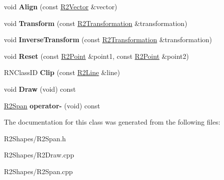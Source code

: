 \begin{DoxyCompactItemize}
\item 
void {\bfseries Align} (const \hyperlink{class_r2_vector}{R2\+Vector} \&vector)\hypertarget{class_r2_span_a7f236a19c3115d31fcbbd44357ebec0a}{}\label{class_r2_span_a7f236a19c3115d31fcbbd44357ebec0a}

\item 
void {\bfseries Transform} (const \hyperlink{class_r2_transformation}{R2\+Transformation} \&transformation)\hypertarget{class_r2_span_a11439f85eeacccb75f43660346f0b758}{}\label{class_r2_span_a11439f85eeacccb75f43660346f0b758}

\item 
void {\bfseries Inverse\+Transform} (const \hyperlink{class_r2_transformation}{R2\+Transformation} \&transformation)\hypertarget{class_r2_span_a86927e2eb43fc03ba5d4dada46475cef}{}\label{class_r2_span_a86927e2eb43fc03ba5d4dada46475cef}

\item 
void {\bfseries Reset} (const \hyperlink{class_r2_point}{R2\+Point} \&point1, const \hyperlink{class_r2_point}{R2\+Point} \&point2)\hypertarget{class_r2_span_ab03cf7bb188bb9eb7bd69a2d27eb5fb9}{}\label{class_r2_span_ab03cf7bb188bb9eb7bd69a2d27eb5fb9}

\item 
R\+N\+Class\+ID {\bfseries Clip} (const \hyperlink{class_r2_line}{R2\+Line} \&line)\hypertarget{class_r2_span_a48e3ed556c7432b8ad500847ad15b266}{}\label{class_r2_span_a48e3ed556c7432b8ad500847ad15b266}

\item 
void {\bfseries Draw} (void) const \hypertarget{class_r2_span_abd8c5b78ed40a072e29acd89a6d0d73a}{}\label{class_r2_span_abd8c5b78ed40a072e29acd89a6d0d73a}

\item 
\hyperlink{class_r2_span}{R2\+Span} {\bfseries operator-\/} (void) const \hypertarget{class_r2_span_a35985c4394199ef239a5ba7a85ae99ce}{}\label{class_r2_span_a35985c4394199ef239a5ba7a85ae99ce}

\end{DoxyCompactItemize}


The documentation for this class was generated from the following files\+:\begin{DoxyCompactItemize}
\item 
R2\+Shapes/R2\+Span.\+h\item 
R2\+Shapes/R2\+Draw.\+cpp\item 
R2\+Shapes/R2\+Span.\+cpp\end{DoxyCompactItemize}
